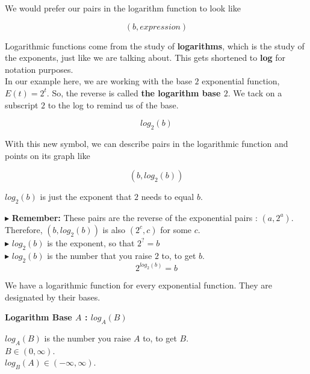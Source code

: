 \documentclass{ximera}
\begin{document}
We would prefer our pairs in the logarithm function to look like 

\[ (b, expression)  \]







Logarithmic functions come from the study of \textbf{logarithms}, which is the study of the exponents, just like we are talking about. This gets shortened to \textbf{log} for notation purposes.  \\



In our example here, we are working with the base $2$ exponential function, $E(t) = 2^t$. So, the reverse is called \textbf{the logarithm base $2$}.  We tack on a subscript $2$ to the log to remind us of the base.



\[   log_2(b)     \]


With this new symbol, we can describe pairs in the logarithmic function and points on its graph like 


\[
(b, log_2(b))
\]


$log_2(b)$ is just the exponent that $2$ needs to equal $b$.





$\blacktriangleright$ \textbf{Remember:} These pairs are the reverse of the exponential pairs : $(a, 2^a)$.  Therefore, $(b, log_2(b))$ is also $(2^c, c)$ for some $c$. \\

$\blacktriangleright$  $log_2(b)$ is the exponent, so that $2^? = b$ \\


$\blacktriangleright$  $log_2(b)$ is the number that you raise $2$ to, to get $b$.  \\

\[   2^{log_2(b)} = b     \]

We have a logarithmic function for every exponential function.  They are designated by their bases.
















\begin{definition} \textbf{\textcolor{green!50!black}{Logarithm Base $A$ : $log_A(B)$}}


$log_A(B)$ is the number you raise $A$ to, to get $B$. \\

$B \in (0, \infty)$. \\

$log_B(A) \in (-\infty, \infty)$.


\end{definition}
\end{document}
